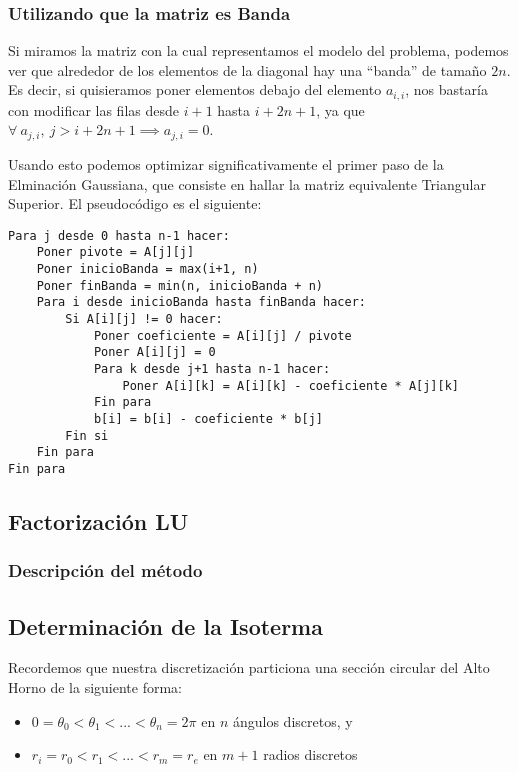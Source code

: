 \subsubsection{Utilizando que la matriz es Banda}

Si miramos la matriz con la cual representamos el modelo del problema, podemos ver que alrededor de los elementos de la diagonal hay una ``banda'' de tamaño $2n$.
Es decir, si quisieramos poner elementos debajo del elemento $a_{i,i}$, nos bastaría con modificar las filas desde $i+1$ hasta $i+2n+1$, ya que $\forall\ a_{j,i},\ j> i+2n+1 \implies a_{j,i} = 0$.

Usando esto podemos optimizar significativamente el primer paso de la Elminación Gaussiana, que consiste en hallar la matriz equivalente Triangular Superior. El pseudocódigo es el siguiente:

\begin{lstlisting}
Para j desde 0 hasta n-1 hacer:
    Poner pivote = A[j][j]
    Poner inicioBanda = max(i+1, n)
    Poner finBanda = min(n, inicioBanda + n)
    Para i desde inicioBanda hasta finBanda hacer:
        Si A[i][j] != 0 hacer:
            Poner coeficiente = A[i][j] / pivote
            Poner A[i][j] = 0
            Para k desde j+1 hasta n-1 hacer:
                Poner A[i][k] = A[i][k] - coeficiente * A[j][k]
            Fin para
            b[i] = b[i] - coeficiente * b[j]
        Fin si
    Fin para
Fin para
\end{lstlisting}

\subsection{Factorización LU}

\subsubsection{Descripción del método}

\subsection{Determinación de la Isoterma}

Recordemos que nuestra discretización particiona una sección circular del Alto Horno de la siguiente forma:
 \begin{itemize}
 	\item $0 = \theta_0 < \theta_1 < ... < \theta_n = 2\pi$ en $n$ \'angulos discretos, y
 	\item $r_i = r_0 < r_1 < ... < r_m = r_e$ en $m+1$ radios discretos
 \end{itemize}

